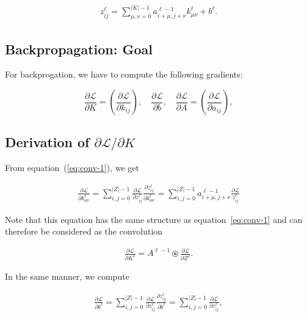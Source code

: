 \documentclass[a4paper,10pt]{article}
\def\Loss{\mathcal{L}}
\begin{document}
\begin{align}
    \label{eq:conv-1}
    z_{ij}^{\ell} = \sum_{\mu, \nu=0}^{|K|-1} a_{i+\mu, j+\nu}^{\ell-1} k_{\mu \nu}^\ell + b^\ell.
\end{align}

\subsection*{Backpropagation: Goal}

For backprogation, we have to compute the following gradients:

\begin{equation}
    \frac{\partial \Loss}{\partial K} = \left( \frac{\partial \Loss}{\partial k_{ij}} \right), \quad 
    \frac{\partial \Loss}{\partial b}, \quad \frac{\partial \Loss}{\partial A} = \left( \frac{\partial \Loss}{\partial a_{ij}} \right),
\end{equation}

\subsection*{Derivation of $\partial \Loss / \partial K$}

From equation~(\ref{eq:conv-1}), we get

\begin{align*}
    \frac{\partial \Loss}{\partial k_{\mu\nu}^\ell} = \sum_{i,j = 0}^{|Z|-1} 
    \frac{\partial \Loss}{\partial z_{ij}^{\ell}} 
    \frac{\partial{z_{ij}^{\ell}}}{\partial k_{\mu\nu}^\ell} = 
    \sum_{i,j=0}^{|Z|-1} a_{i + \mu, j + \nu}^{\ell -1} \frac{\partial \Loss}{z_{ij}^{\ell}}
\end{align*}

Note that this equation has the same structure as equation~\ref{eq:conv-1} and
can therefore be considered as the convolution

\begin{align*}
    \boxed{    
    \frac{\partial \Loss}{\partial K^\ell} = A^{\ell-1} \circledast \frac{\partial \Loss}{\partial Z^{\ell}}.
    }
\end{align*}

In the same manner, we compute

\begin{align*}
    \frac{\partial \Loss}{\partial b^\ell} = \sum_{i,j=0}^{|Z|-1} 
    \frac{\partial \Loss}{\partial z_{ij}^\ell} \frac{\partial z_{ij}^\ell}{\partial b^\ell} 
    = \sum_{i,j=0}^{|Z|-1} \frac{\partial \Loss}{\partial z_{ij}^\ell},
\end{align*}
\end{document}
